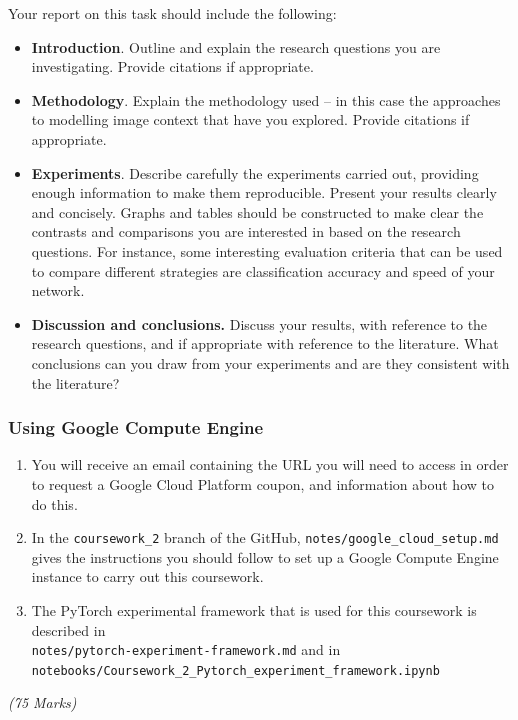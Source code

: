 \documentclass[11pt,]{article}
\begin{document}
Your report on this task should include the following:
\begin{itemize}
    \item \textbf{Introduction}.  Outline and explain the research questions you are investigating.  Provide citations if appropriate.
    \item \textbf{Methodology}.  Explain the methodology used -- in this case the approaches to modelling image context that have you explored.   Provide citations if appropriate.
    \item \textbf{Experiments}.  Describe carefully the experiments carried out, providing enough information to make them reproducible.  Present your results clearly and concisely.  Graphs and tables should be constructed to make clear the contrasts and comparisons you are interested in based on the research questions. For instance, some interesting evaluation criteria that can be used to compare different strategies are classification accuracy and speed of your network.
    \item \textbf{Discussion and conclusions.}  Discuss your results, with reference to the research questions, and if appropriate with reference to the literature.  What conclusions can you draw from your experiments and are they consistent with the literature?
\end{itemize}


\subsubsection*{Using Google Compute Engine}
\begin{enumerate}
    \item You will receive an email containing the URL you will need to access in order to request a Google Cloud Platform coupon, and information about how to do this.
    \item In the \texttt{coursework\_2} branch of the GitHub, \texttt{notes/google\_cloud\_setup.md} gives the instructions you should follow to set up a Google Compute Engine instance to carry out this coursework.
    \item The PyTorch experimental framework that is used for this coursework is described in\\\texttt{notes/pytorch-experiment-framework.md} and in\\\texttt{notebooks/Coursework\_2\_Pytorch\_experiment\_framework.ipynb}
\end{enumerate}

\emph{(75 Marks)}
\end{document}
